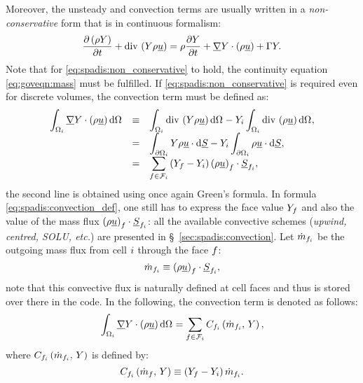 Moreover, the unsteady and convection terms are usually written in a \emph{non-conservative} form that is in continuous formalism:
\begin{equation}\label{eq:spadis:non_conservative}
 \dfrac{\partial  \left( \rho Y \right)}{\partial t} + \text{div}\, \left(  Y  \rho \underline{u}\right) = \rho \dfrac{\partial Y }{\partial t} + \underline{\nabla} Y \cdot \left( \rho \underline{u}\right) + \Gamma Y.
 \end{equation}
 Note that for \eqref{eq:spadis:non_conservative} to hold, the continuity equation \eqref{eq:goveqn:mass} must be fulfilled.
 If \eqref{eq:spadis:non_conservative} is required even for discrete volumes, the convection term must be defined as:
 \begin{equation}\label{eq:spadis:convection_def}
 \begin{array}{r c l}
\displaystyle \int_{\Omega_{i}} \underline{\nabla} Y \cdot \left( \rho \underline{u} \right) \mathrm{d} \Omega_{} &\equiv &
\displaystyle \int_{\Omega_{i}}  \text{div}\, \left( Y \rho \underline{u} \right) \mathrm{d} \Omega_{}  - Y_i  \int_{\Omega_{i}} \text{div}\, \left(\rho \underline{u} \right) \mathrm{d} \Omega_{}, \\
 &=&
 \displaystyle \int_{ \partial \Omega_{i}}   Y \rho \underline{u} \cdot \mathrm{d} \underline{S}  - Y_i  \int_{ \partial \Omega_{i}} \rho \underline{u} \cdot \mathrm{d} \underline{S}, \\
 &=&
\displaystyle \sum_{{f} \in \mathcal{F}_{i}} \left(Y_{f} - Y_i \right) \left(\rho \underline{u}\right)_{f} \cdot \underline{S}_{{f_i}},
 \end{array}
 \end{equation}
the second line is obtained using once again Green's formula. In formula \eqref{eq:spadis:convection_def}, one still has to express the face value
 $Y_{f}$ and also the value of the mass flux $\left(\rho \underline{u}\right)_{f}\cdot \underline{S}_{{f_i}}$: all the available convective schemes (\emph{upwind, centred, SOLU, etc.}) are presented in \S~\ref{sec:spadis:convection}. Let $\dot{m}_{f_i}$ be the outgoing
 mass flux from cell $i$ through the face ${f}$:
  \begin{equation}\label{eq:spadis:massflux_def}
\dot{m}_{f_i} \equiv \left(\rho \underline{u}\right)_{f} \cdot \underline{S}_{{f_i}},
 \end{equation}
note that this convective flux is naturally defined at cell faces and thus is stored over there in the code. In the following, the convection term is denoted as follows:
\begin{equation}\label{eq:spadis:convection_notation}
\displaystyle \int_{\Omega_{i}} \underline{\nabla} Y \cdot \left( \rho \underline{u} \right) \mathrm{d} \Omega_{}
=
\displaystyle \sum_{{f} \in \mathcal{F}_{i}} C_{f_i} \left( \dot{m}_{f_i} , \, Y \right),
 \end{equation}
where $C_{f_i} \left(  \dot{m}_{f_i}  , \, Y\right)$ is defined by:
\begin{equation}\label{eq:spadis:convection_flux}
C_{f_i} \left(\dot{m}_{f} , \, Y \right) \equiv  \left(Y_{f} - Y_i \right) \dot{m}_{f_i}.
 \end{equation}

